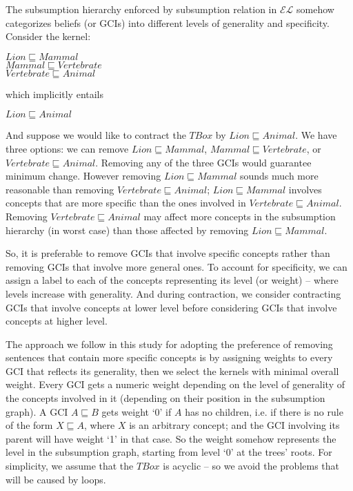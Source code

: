 \documentclass{sfuthesis}
\theoremstyle{plain}
\theoremstyle{definition}
\begin{document}
The subsumption hierarchy enforced by subsumption relation in $\mathcal{EL}$ somehow categorizes beliefs (or GCIs) into different levels of generality and specificity. Consider the kernel:%
\begin{center}
$Lion \sqsubseteq Mammal$\\
$Mammal \sqsubseteq Vertebrate$\\
$Vertebrate \sqsubseteq Animal$
\end{center}
which implicitly entails
\begin{center}
$Lion \sqsubseteq Animal$
\end{center}
And suppose we would like to contract the $TBox$ by $Lion \sqsubseteq Animal$. We have three options: we can remove $Lion \sqsubseteq Mammal$, $Mammal \sqsubseteq Vertebrate$, or $Vertebrate \sqsubseteq Animal$. Removing any of the three GCIs would guarantee minimum change. However removing $Lion \sqsubseteq Mammal$ sounds much more reasonable than removing $Vertebrate \sqsubseteq Animal$; $Lion \sqsubseteq Mammal$ involves concepts that are more specific than the ones involved in $Vertebrate \sqsubseteq Animal$. Removing $Vertebrate \sqsubseteq Animal$ may affect more concepts in the subsumption hierarchy (in worst case) than those affected by removing $Lion \sqsubseteq Mammal$. 

So, it is preferable to remove GCIs that involve specific concepts rather than removing GCIs that involve more general ones. To account for specificity, we can assign a label to each of the concepts representing its level (or weight) -- where levels increase with generality. And during contraction, we consider contracting GCIs that involve concepts at lower level before considering GCIs that involve concepts at higher level.

The approach we follow in this study for adopting the preference of removing sentences that contain more specific concepts is by assigning weights to every GCI that reflects its generality, then we select the kernels with minimal overall weight. Every GCI gets a numeric weight depending on the level of generality of the concepts involved in it (depending on their position in the subsumption graph). A GCI $A \sqsubseteq B$ gets weight `0' if $A$ has no children, i.e. if there is no rule of the form $X \sqsubseteq A$, where $X$ is an arbitrary concept; and the GCI involving its parent will have weight `1' in that case. So the weight somehow represents the level in the subsumption graph, starting from level `0' at the trees' roots. For simplicity, we assume that the $TBox$ is acyclic -- so we avoid the problems that will be caused by loops.
\end{document}
